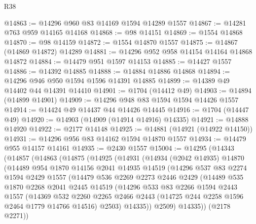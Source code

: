 \begin{lexlean}{R38}
\begin{coremodule}
@14863 := @14296 @960 @83 @14169 @1594 @14289 @1557
@14867 := @14281 @763 @959 @14165 @14168
@14868 := @98 @14151
@14869 := @1554 @14868
@14870 := @98 @14159
@14872 := @1554 @14870 @1557
@14875 := @14867 (@14869 @14872) @14289
@14881 := @14296 @952 @958 @14154 @14164 @14868 @14872
@14884 := @14479 @951 @1597 @14153
@14885 := @14427 @1557
@14886 := @14392 @14885
@14888 := @14884 @14886 @14868
@14894 := @14296 @946 @950 @1594 @1596 @14391 @14885
@14899 := @14389 @49 @14402 @44 @14391 @14410
@14901 := @1704 (@14412 @49)
@14903 := @14894 (@14899 @14901)
@14909 := @14296 @948 @83 @1594 @1594 @14426 @1557
@14914 := @14424 @49 @14437 @44 @14426 @14445
@14916 := @1704 (@14447 @49)
@14920 := @14903 (@14909 (@14914 @14916) @14335)
@14921 := @14888 @14920
@14922 := @2177 @14148
@14925 := @14881 (@14921 (@14922 @14150))
@14931 := @14296 @956 @83 @14162 @1594 @14870 @1557
@14934 := @14479 @955 @14157 @14161
@14935 := @2430 @1557
@15004 := @14295
    (@14343
      (@14857
        (@14863
          (@14875
            (@14925
              (@14931
                (@14934
                  (@2042 @14935)
                  @14870
                  (@14489
                    @954
                    @1870
                    @14156
                    @2041
                    @14935
                    @14519
                    (@14296
                      @537
                      @83
                      @2274
                      @1594
                      @2429
                      @1557
                      (@14479
                        @536
                        @2269
                        @2273
                        @2446
                        @2429
                        (@14489
                          @535
                          @1870
                          @2268
                          @2041
                          @2445
                          @14519
                          (@14296
                            @533
                            @83
                            @2266
                            @1594
                            @2443
                            @1557
                            (@14369
                              @532
                              @2260
                              @2265
                              @2466
                              @2443
                              (@14725 @244 @2258 @1596 @2464 @1779 @14766 @14516)
                              @2503)
                            @14335))
                        @2509)
                      @14335))
                  (@2178 @2271))

\end{coremodule}
\end{lexlean}
